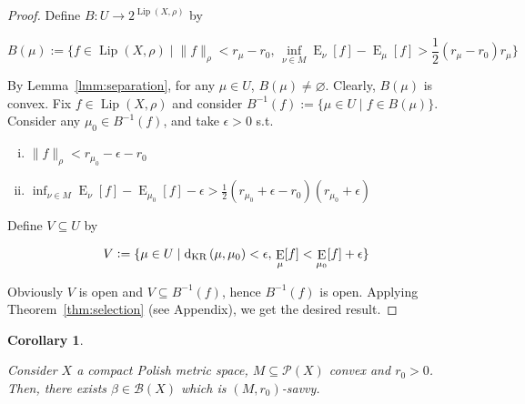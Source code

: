 \documentclass[11pt]{article}
\theoremstyle{definition}
\theoremstyle{plain}
\newtheorem{corollary}{Corollary}%
\newcommand{\N}[1]{\lVert #1 \rVert}
\DeclareMathOperator{\E}{E}
\newcommand{\PM}{\mathcal{P}}
\newcommand{\Lp}{{\operatorname{Lip}}}
\newcommand{\DKR}{\operatorname{d}_{\textnormal{KR}}}
\newcommand{\Gm}{\mathcal{B}}
\begin{document}
\begin{proof}

Define $B: U \rightarrow 2^{\Lp\left(X,\rho\right)}$ by

$$B\left(\mu\right):=\{f \in \Lp\left(X,\rho\right) \mid \N{f}_\rho < r_\mu - r_0,\, \inf_{\nu \in M} \E_\nu[f] - \E_\mu[f] > \frac{1}{2}\left(r_\mu - r_0\right) r_\mu\}$$

By Lemma~\ref{lmm:separation}, for any $\mu \in U$, $B\left(\mu\right) \ne \varnothing$. Clearly, $B\left(\mu\right)$ is convex. Fix $f \in \Lp\left(X,\rho\right)$ and consider $B^{-1}\left(f\right):=\{\mu \in U \mid f \in B\left(\mu\right)\}$. Consider any $\mu_0 \in B^{-1}\left(f\right)$, and take $\epsilon > 0$ s.t.

\begin{enumerate}[i.]

\item $\N{f}_\rho < r_{\mu_0}  - \epsilon - r_0$
\item $\inf_{\nu \in M} \E_\nu[f] - \E_{\mu_0}[f] -\epsilon > \frac{1}{2}\left(r_{\mu_0} + \epsilon  - r_0\right) \left(r_{\mu_0} + \epsilon\right)$

\end{enumerate}

Define $V \subseteq U$ by 

$$V := \{\mu \in U \mid \DKR\left(\mu,\mu_0\right) < \epsilon,\, \E_\mu[f] < \E_{\mu_0}[f] + \epsilon\}$$

Obviously $V$ is open and $V \subseteq B^{-1}\left(f\right)$, hence $B^{-1}\left(f\right)$ is open. Applying Theorem~\ref{thm:selection} (see Appendix), we get the desired result.
\end{proof}

\begin{samepage}
\begin{corollary}
\label{crl:savvy}

Consider $X$ a compact Polish metric space, $M \subseteq \PM\left(X\right)$ convex and $r_0 > 0$. Then, there exists $\beta \in \Gm\left(X\right)$ which is $\left(M,r_0\right)$-savvy.

\end{corollary}
\end{samepage}
\end{document}
